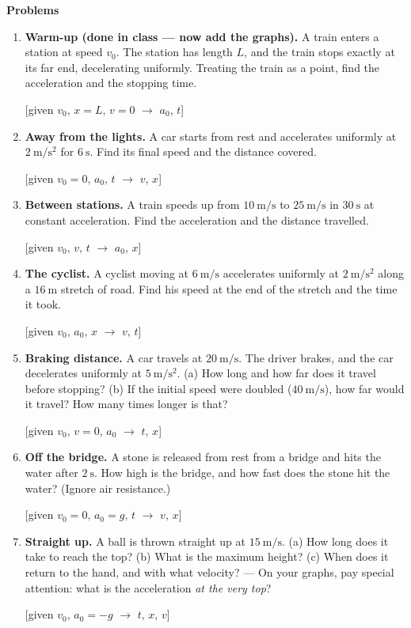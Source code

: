 \documentclass[11pt,a4paper]{article}
\newcommand{\given}[1]{\par\noindent\hfill{\small\color{muted}[#1]}\par}
\newcommand{\given}[1]{}
\newcommand{\nsec}[1]{\vspace{9pt}\par{\color{accent}\large\bfseries #1}\par\vspace{2pt}}
\newcommand{\ms}{\ \mathrm{m/s}}
\newcommand{\mss}{\ \mathrm{m/s^2}}
\begin{document}
\nsec{Problems}

\begin{enumerate}[label=\textcolor{accent}{\textbf{\arabic*.}}, leftmargin=1.9em,
                  itemsep=7pt, topsep=3pt, start=0]

\item \textbf{Warm-up (done in class --- now add the graphs).}
A train enters a station at speed $v_0$. The station has length $L$, and the train stops
exactly at its far end, decelerating uniformly. Treating the train as a point, find the
acceleration and the stopping time. \given{given $v_0,\,x{=}L,\,v{=}0$ \;$\to$\; $a_0,\,t$}

\item \textbf{Away from the lights.}
A car starts from rest and accelerates uniformly at $2\mss$ for $6\ \mathrm{s}$.
Find its final speed and the distance covered. \given{given $v_0{=}0,\,a_0,\,t$ \;$\to$\; $v,\,x$}

\item \textbf{Between stations.}
A train speeds up from $10\ms$ to $25\ms$ in $30\ \mathrm{s}$ at constant acceleration.
Find the acceleration and the distance travelled. \given{given $v_0,\,v,\,t$ \;$\to$\; $a_0,\,x$}

\item \textbf{The cyclist.}
A cyclist moving at $6\ms$ accelerates uniformly at $2\mss$ along a $16\ \mathrm{m}$
stretch of road. Find his speed at the end of the stretch and the time it took.
\given{given $v_0,\,a_0,\,x$ \;$\to$\; $v,\,t$}

\item \textbf{Braking distance.}
A car travels at $20\ms$. The driver brakes, and the car decelerates uniformly at
$5\mss$. \;(a) How long and how far does it travel before stopping?
\;(b) If the initial speed were doubled ($40\ms$), how far would it travel? How many
times longer is that? \given{given $v_0,\,v{=}0,\,a_0$ \;$\to$\; $t,\,x$}

\item \textbf{Off the bridge.}
A stone is released from rest from a bridge and hits the water after $2\ \mathrm{s}$.
How high is the bridge, and how fast does the stone hit the water? (Ignore air
resistance.) \given{given $v_0{=}0,\,a_0{=}g,\,t$ \;$\to$\; $v,\,x$}

\item \textbf{Straight up.}
A ball is thrown straight up at $15\ms$. \;(a) How long does it take to reach the top?
\;(b) What is the maximum height? \;(c) When does it return to the hand, and with what
velocity? --- On your graphs, pay special attention: what is the acceleration \emph{at
the very top}? \given{given $v_0,\,a_0{=}-g$ \;$\to$\; $t,\,x,\,v$}


\end{enumerate}
\end{document}
